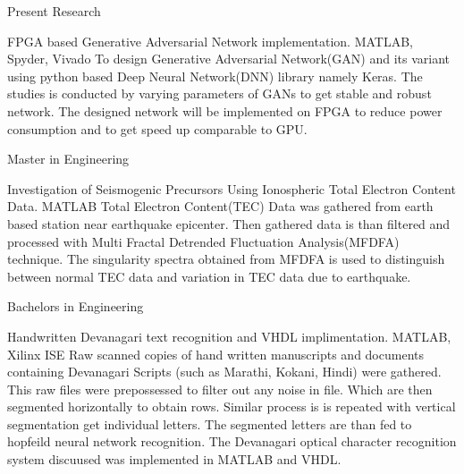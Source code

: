 \documentclass[fontsize=11pt]{tccv}
\begin{document}
\begin{fromto}
	\item{Present Research}
\end{fromto}
\begin{project}
	\item{FPGA based Generative Adversarial Network implementation.}
	{MATLAB, Spyder, Vivado}
	{To design Generative Adversarial Network(GAN) and its variant using python based Deep Neural Network(DNN) library namely Keras. The studies is conducted by varying parameters of GANs to get stable and robust network. The designed network will be implemented on  FPGA  to reduce power consumption and to get speed up comparable to GPU.  }\\
\end{project}
\vspace{1em}

\begin{fromto}
	\item{Master in Engineering}
\end{fromto}
\begin{project}
	\item{Investigation of Seismogenic Precursors Using Ionospheric Total Electron Content Data.}
	{MATLAB}
	{Total Electron Content(TEC) Data was gathered from earth based station near earthquake epicenter. Then gathered data is than filtered and processed with Multi Fractal Detrended Fluctuation Analysis(MFDFA) technique. The singularity spectra obtained from MFDFA is used to distinguish between normal TEC data and variation in TEC data due to earthquake.}\\
\end{project}
\vspace{1em}

\vspace{1em}
\begin{fromto}
	\item{Bachelors in Engineering}
\end{fromto}
\begin{project}
	\item{ Handwritten Devanagari text recognition and VHDL implimentation.}
	{MATLAB, Xilinx ISE}
	{Raw scanned copies of hand written manuscripts and documents containing Devanagari Scripts (such as Marathi, Kokani, Hindi) were gathered. This raw files were prepossessed to filter out any noise in file. Which are then segmented horizontally to obtain rows. Similar process is is repeated with vertical segmentation get individual letters. The segmented letters are than fed to hopfeild neural network recognition. The Devanagari optical character recognition system discuused was  implemented in MATLAB and VHDL.}\\
\end{project}	
\vspace{1em}
\end{document}
